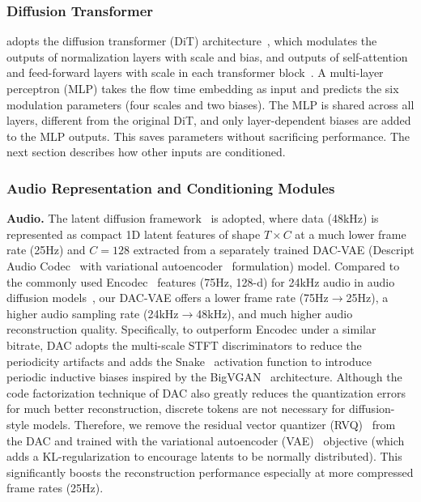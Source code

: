 \subsubsection{Diffusion Transformer}
\mvga{} adopts the diffusion transformer (DiT) architecture~\citep{dit},
which modulates the  outputs of normalization layers with scale and bias,
and outputs of self-attention and feed-forward layers with scale in each transformer block~\citep{vaswani2017attention}.
A multi-layer perceptron (MLP) takes the flow time embedding as input and predicts the six modulation parameters (four scales and two biases).
The MLP is shared across all layers, different from the original DiT, and only layer-dependent biases are added to the MLP outputs.
This saves parameters without sacrificing performance. The next section describes how other inputs are conditioned.


\subsubsection{Audio Representation and Conditioning Modules}\label{sec:audio_repr_and_cond}

\textbf{Audio.}
The latent diffusion framework~\citep{rombach2021highresolution} is adopted,
where data (48kHz) is represented as compact 1D latent features of shape $T \times C$ at a much lower frame rate (25Hz) and $C=128$ extracted from a separately trained DAC-VAE (Descript Audio Codec~\citep{kumar2024high} with variational autoencoder~\citep{kingma2013auto} formulation) model.
Compared to the commonly used Encodec~\citep{Defossez2022HighFN} features (75Hz, 128-d) for 24kHz audio in audio diffusion models~\citep{shen2023naturalspeech, vyas2023audiobox},
our DAC-VAE offers a lower frame rate (75Hz$\rightarrow$25Hz), a higher audio sampling rate (24kHz$\rightarrow$48kHz), and much higher audio reconstruction quality.
Specifically, to outperform Encodec under a similar bitrate, DAC adopts the multi-scale STFT discriminators to reduce the periodicity artifacts and adds the Snake~\citep{ziyin2020neural} activation function to introduce periodic inductive biases inspired by the BigVGAN~\citep{lee2022bigvgan} architecture.
Although the code factorization technique of DAC also greatly reduces the quantization errors for much better reconstruction, discrete tokens are not necessary for diffusion-style models.
Therefore, we remove the residual vector quantizer (RVQ)~\citep{van2017neural, gray1984vector} from the DAC and trained with the variational autoencoder (VAE)~\citep{kingma2013auto} objective (which adds a KL-regularization to encourage latents to be normally distributed).
This significantly boosts the reconstruction performance especially at more compressed frame rates (25Hz).

